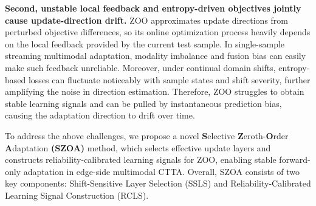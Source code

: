 \textbf{Second, unstable local feedback and entropy-driven objectives jointly cause update-direction drift.}
ZOO approximates update directions from perturbed objective differences, so its online optimization process heavily depends on the local feedback provided by the current test sample.
In single-sample streaming multimodal adaptation, modality imbalance and fusion bias can easily make such feedback unreliable.
Moreover, under continual domain shifts, entropy-based losses can fluctuate noticeably with sample states and shift severity, further amplifying the noise in direction estimation.
Therefore, ZOO struggles to obtain stable learning signals and can be pulled by instantaneous prediction bias, causing the adaptation direction to drift over time.

To address the above challenges, we propose a novel
\textbf{S}elective \textbf{Z}eroth-\textbf{O}rder \textbf{A}daptation \textbf{(SZOA)} method, which selects effective update layers and constructs reliability-calibrated learning signals for ZOO, enabling stable forward-only adaptation in edge-side multimodal CTTA.
Overall, SZOA consists of two key components: Shift-Sensitive Layer Selection (SSLS) and Reliability-Calibrated Learning Signal Construction (RCLS).
